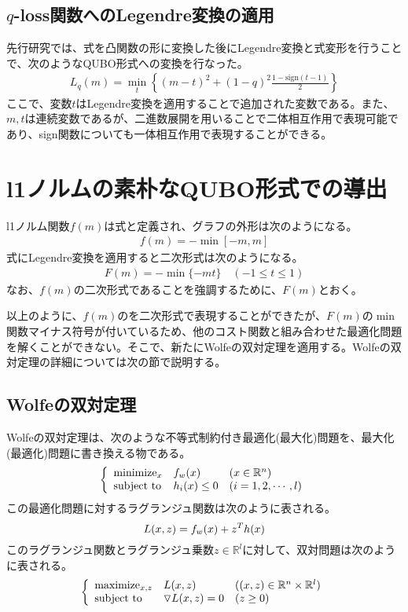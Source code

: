 \documentclass[paper]{ieicej}
\begin{document}
\subsection{$q$-loss関数へのLegendre変換の適用}
先行研究では、式を凸関数の形に変換した後にLegendre変換と式変形を行うことで、次のようなQUBO形式への変換を行なった。
\begin{eqnarray}
 L_{q}(m) = \min_{t}{\left\{(m-t)^{2}+(1-q)^{2}\frac{1-\mathrm{sign}(t-1)}{2}\right\}} \nonumber
\end{eqnarray}
ここで、変数$t$はLegendre変換を適用することで追加された変数である。また、$m,t$は連続変数であるが、二進数展開を用いることで二体相互作用で表現可能であり、sign関数についても一体相互作用で表現することができる。

\section{l1ノルムの素朴なQUBO形式での導出}
l1ノルム関数$f(m)$は式と定義され、グラフの外形は次のようになる。
\begin{eqnarray}
 f(m) = -\min{[-m,m]}
\end{eqnarray}
式にLegendre変換を適用すると二次形式は次のようになる。
\begin{eqnarray}
 F(m) = -\min{\{-mt\}} \quad (-1\leq t\leq 1)
\end{eqnarray}
なお、$f(m)$の二次形式であることを強調するために、$F(m)$とおく。

以上のように、$f(m)$のを二次形式で表現することができたが、$F(m)$の$\min$関数マイナス符号が付いているため、他のコスト関数と組み合わせた最適化問題を解くことができない。そこで、新たにWolfeの双対定理を適用する。Wolfeの双対定理の詳細については次の節で説明する。
\subsection{Wolfeの双対定理}
Wolfeの双対定理は、次のような不等式制約付き最適化(最大化)問題を、最大化(最適化)問題に書き換える物である。
\begin{equation}
  \left \{
  \begin{array}{lll}
    $minimize$_{x} & f_{w}(x) & (x\in\mathbb{R}^{n}) \\
    $subject to$ & h_{i}(x)\leq 0 & (i=1,2,\cdots,l)
  \end{array}
  \right. \notag
\end{equation}
この最適化問題に対するラグランジュ関数は次のように表される。
\begin{equation}
  L(x,z)=f_{w}(x)+z^{T}h(x) \notag
\end{equation}
このラグランジュ関数とラグランジュ乗数$z\in\mathbb{R}^{l}$に対して、双対問題は次のように表される。
\begin{equation}
  \left \{
  \begin{array}{lll}
    $maximize$_{x,z} & L(x,z) & ((x,z)\in\mathbb{R}^{n}\times\mathbb{R}^{l}) \\
    $subject to$ & \triangledown L(x,z)=0 & (z\geq 0)
  \end{array}
  \right. \notag
\end{equation}
\end{document}
